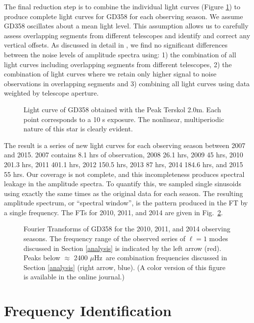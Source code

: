 \documentclass[12pt,preprint]{aastex}
\newcommand{\muHz}{\mbox{$\mu$Hz}}
\begin{document}
The final reduction step is to combine the individual light curves (Figure \ref{tersk}) to produce 
complete light curves for GD358 for each observing season. We assume GD358 oscillates about 
a mean light level. This assumption allows us to carefully assess overlapping segments from 
different telescopes and identify and correct any vertical offsets. As discussed in detail 
in \citet{Provencal09}, we find no significant differences between the noise levels of 
amplitude spectra using: 1) the combination of all light curves including overlapping 
segments from different telescopes, 2) the combination of light curves where we retain 
only higher signal to noise observations in overlapping segments and 3) combining all light 
curves using data weighted by telescope aperture.

\begin{figure}
\caption{Light curve of GD358 obtained with the Peak Terskol 2.0m.  Each point corresponds 
to a 10 s exposure. The nonlinear, multiperiodic nature of this star is clearly evident.
\label{tersk}
}
\end{figure}

The result is a series of new light curves for each observing season between 2007 and 2015. 
2007 contains 8.1 hrs of observation, 2008 26.1 hrs, 2009 45 hrs, 2010 201.3 hrs, 2011 
401.1 hrs, 2012 150.5 hrs, 2013 87 hrs, 2014 184.6 hrs, and 2015 55 hrs. Our coverage is 
not complete, and this incompleteness produces spectral leakage in the amplitude spectra. 
To quantify this, we sampled single sinusoids using exactly the same times as the original 
data for each season. The resulting amplitude spectrum, or ``spectral window'', is the 
pattern produced in the FT by a single frequency. The FTs for 2010, 2011, and 2014 
are given in Fig.~\ref{fts}.


\begin{figure}
\caption{Fourier Transforms of GD358 for the 2010, 2011, and 2014 observing seasons.
The frequency range of the observed series of $\ell=1$ modes discussed in Section \ref{analysis} 
is indicated by the left arrow (red).  Peaks below $\approx$ 2400 \muHz\ are combination 
frequencies discussed in Section \ref{analysis} (right arrow, blue). 
(A color version of this figure is available in the online journal.)
\label{fts}
}
\end{figure}

\section{Frequency Identification}\label{freq}
 
\end{document}
